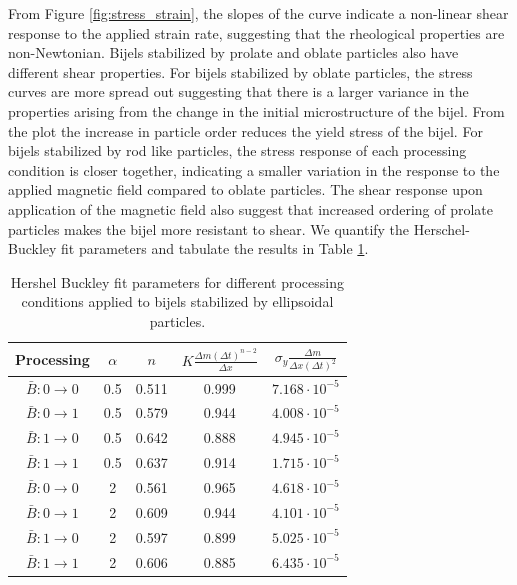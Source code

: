 From Figure \ref{fig:stress_strain}, the slopes of the curve indicate a non-linear shear response to the applied strain rate, suggesting that the rheological properties
are non-Newtonian. Bijels stabilized by prolate and oblate particles also have different shear properties. For bijels stabilized by oblate particles, the stress curves
are more spread out suggesting that there is a larger variance in the properties arising from the change in the initial microstructure of the bijel. From the plot
the increase in particle order reduces the yield stress of the bijel. For bijels stabilized by rod like particles, the stress response of each processing 
condition is closer together, indicating a smaller variation in the response to the applied magnetic field compared to oblate particles. The shear response upon application
of the magnetic field also suggest that increased ordering of prolate particles makes the bijel more resistant to shear. We quantify the Herschel-Buckley fit parameters and 
tabulate the results in Table \ref{table:rheology_fit}.

\begin{table}[h!]
    \centering
    \renewcommand{\arraystretch}{1.5}  %
    \begin{tabular}{||c c c c c||} 
     \hline
     Processing & $\alpha$ & $n$ & $K \frac{\Delta m (\Delta t)^{n-2}}{\Delta x} $ & $\sigma_{y} \frac{\Delta m}{\Delta x (\Delta t)^2}$ \\ [0.5ex] 
     \hline\hline
     $\bar{B}: 0 \rightarrow 0$ & 0.5 & 0.511 & 0.999 & $7.168 \cdot 10^{-5}$ \\ 
     \hline
     $\bar{B}: 0 \rightarrow 1$ & 0.5 & 0.579 & 0.944 & $4.008 \cdot 10^{-5}$ \\
     \hline
     $\bar{B}: 1 \rightarrow 0$ & 0.5 & 0.642 & 0.888 & $4.945 \cdot 10^{-5}$ \\
     \hline
     $\bar{B}: 1 \rightarrow 1$ & 0.5 & 0.637 & 0.914 & $1.715 \cdot 10^{-5}$ \\
     \hline
     $\bar{B}: 0 \rightarrow 0$ & 2 & 0.561 & 0.965 & $4.618 \cdot 10^{-5}$ \\
     \hline
     $\bar{B}: 0 \rightarrow 1$ & 2 & 0.609 & 0.944 & $4.101 \cdot 10^{-5}$ \\
     \hline
     $\bar{B}: 1 \rightarrow 0$ & 2 & 0.597 & 0.899 & $5.025 \cdot 10^{-5}$ \\
     \hline
     $\bar{B}: 1 \rightarrow 1$ & 2 & 0.606 & 0.885 & $6.435 \cdot 10^{-5}$ \\ [1ex] 
     \hline
    \end{tabular}
    \caption{Hershel Buckley fit parameters for different processing conditions applied to bijels stabilized by ellipsoidal particles.}
    \label{table:rheology_fit}
\end{table}
 
